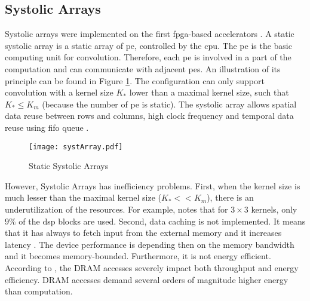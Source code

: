 \subsection{Systolic Arrays}
%
%
Systolic arrays were implemented on the first \acrshort{fpga}-based accelerators \cite{farabet_cnp_2009, gokhale_240_2014}. A static systolic array is a static array of \acrshort{pe}, controlled by the \acrshort{cpu}. The \acrshort{pe} is the basic computing unit for convolution. Therefore, each \acrshort{pe} is involved in a part of the computation and can communicate with adjacent \acrshort{pe}s. An illustration of its principle can be found in Figure \ref{fig:sytar}. The configuration can only support convolution with a kernel size $K_*$ lower than a maximal kernel size, such that $K_* \leq K_m$ (because the number of \acrshort{pe} is static). The systolic array allows spatial data reuse between rows and columns, high clock frequency and temporal data reuse using \acrshort{fifo} queue \cite{joos_de_ter_beerst_accelerating_2019, mittal_survey_2020}.
%
\begin{figure}
    \centering
    \texttt{[image: systArray.pdf]}
    \caption{Static Systolic Arrays}
    \label{fig:sytar}
\end{figure}

However, Systolic Arrays has inefficiency problems. First, when the kernel size is much lesser than the maximal kernel size ($K_* << K_m$), there is an underutilization of the resources. For example, \cite{gokhale_240_2014} notes that for $3 \times 3$ kernels, only $9\%$ of the \acrfull{dsp} blocks are used. Second, data caching is not implemented. It means that it has always to fetch input from the external memory and it increases latency \cite{wei_automated_2017, abdelouahab_accelerating_2018}. The device performance is depending then on the memory bandwidth and it becomes memory-bounded. Furthermore, it is not energy efficient. According to \textcite{horowitz_11_2014}, the DRAM accesses severely impact both throughput and energy efficiency. DRAM accesses demand several orders of magnitude higher energy than computation.
%
%
